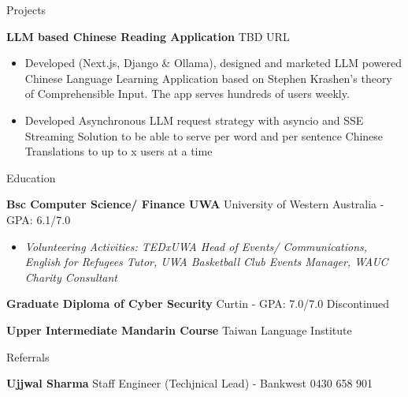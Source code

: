\documentclass{resume} %
\begin{document}
	\begin{rSection}{Projects}
		\vspace{-0.8em}
		\item \textbf{LLM based Chinese Reading Application} {\hfill {} TBD URL}  
		\begin{itemize} 
			\item Developed (Next.js, Django \& Ollama), designed and marketed LLM powered Chinese Language Learning Application based on Stephen Krashen's theory of Comprehensible Input. The app serves hundreds of users weekly.
			\item Developed Asynchronous LLM request strategy with asyncio and SSE Streaming Solution to be able to serve per word and per sentence Chinese Translations to up to x users at a time
		\end{itemize}
	\end{rSection} 

	
	\begin{rSection}{Education}
		\vspace{-0.8em}
		\item \textbf{Bsc Computer Science/ Finance UWA} {University of Western Australia} - GPA: 6.1/7.0 \hfill 
		\begin{itemize} 
			\scriptsize\item \textit{Volunteering Activities: TEDxUWA Head of Events/ Communications, English for Refugees Tutor, UWA Basketball Club Events Manager, WAUC Charity Consultant} \hfill
		\end{itemize}
		\item \textbf{Graduate Diploma of Cyber Security} {Curtin} - GPA: 7.0/7.0 \hfill Discontinued
		\item \textbf{Upper Intermediate Mandarin Course} {Taiwan Language Institute}\hfill 
	\end{rSection} 

	
	\begin{rSection}{Referrals} 
		\vspace{-0.8em}
		\item \textbf{Ujjwal Sharma} {Staff Engineer (Techjnical Lead) - Bankwest} 
			\hfill 
			 0430 658 901
	\end{rSection}
\end{document}
